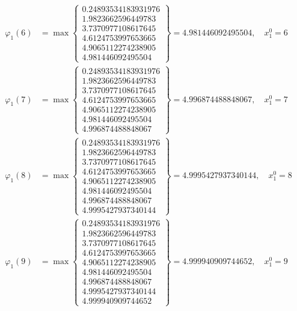 \documentclass{article}
\begin{document}
\begin{align*}
  
\varphi_{1}(6) &= \max \left\{ \begin{array}{c}
0.24893534183931976 \\
 1.9823662596449783 \\
 3.7370977108617645 \\
 4.6124753997653665 \\
 4.9065112274238905 \\
 4.981446092495504
\end{array} \right\} = 4.981446092495504, \quad x_{1}^0 = 6\\
  
  
  
  
\varphi_{1}(7) &= \max \left\{ \begin{array}{c}
0.24893534183931976 \\
 1.9823662596449783 \\
 3.7370977108617645 \\
 4.6124753997653665 \\
 4.9065112274238905 \\
 4.981446092495504 \\
 4.996874488848067
\end{array} \right\} = 4.996874488848067, \quad x_{1}^0 = 7\\
  
  
  
  
\varphi_{1}(8) &= \max \left\{ \begin{array}{c}
0.24893534183931976 \\
 1.9823662596449783 \\
 3.7370977108617645 \\
 4.6124753997653665 \\
 4.9065112274238905 \\
 4.981446092495504 \\
 4.996874488848067 \\
 4.9995427937340144
\end{array} \right\} = 4.9995427937340144, \quad x_{1}^0 = 8\\
  
  
  
  
\varphi_{1}(9) &= \max \left\{ \begin{array}{c}
0.24893534183931976 \\
 1.9823662596449783 \\
 3.7370977108617645 \\
 4.6124753997653665 \\
 4.9065112274238905 \\
 4.981446092495504 \\
 4.996874488848067 \\
 4.9995427937340144 \\
 4.999940909744652
\end{array} \right\} = 4.999940909744652, \quad x_{1}^0 = 9\\
  

\end{align*}
\end{document}
